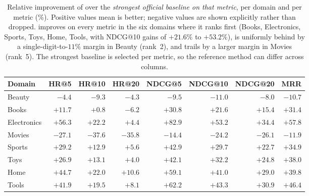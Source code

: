 \begin{table}[t]
\centering
\scriptsize
\setlength{\tabcolsep}{4pt}
\caption{Relative improvement of \method{} over the \emph{strongest official
baseline on that metric}, per domain and per metric (\%). Positive values mean
\method{} is better; negative values are shown explicitly rather than dropped.
\method{} improves on every metric in the six domains where it ranks first
(Books, Electronics, Sports, Toys, Home, Tools, with NDCG@10 gains of
$+21.6\%$ to $+53.2\%$), is uniformly behind by a single-digit-to-$11\%$ margin
in Beauty (rank~2), and trails by a larger margin in Movies (rank~5). The
strongest baseline is selected per metric, so the reference method can differ
across columns.}
\label{tab:improvement_over_strongest}
\begin{tabular}{lrrrrrrr}
\toprule
Domain & HR@5 & HR@10 & HR@20 & NDCG@5 & NDCG@10 & NDCG@20 & MRR \\
\midrule
Beauty & $-4.4$ & $-9.3$ & $-4.3$ & $-9.5$ & $-11.0$ & $-8.0$ & $-10.7$ \\
Books & $+11.7$ & $+0.8$ & $-6.2$ & $+30.8$ & $+21.6$ & $+15.4$ & $+31.4$ \\
Electronics & $+56.3$ & $+22.2$ & $+4.4$ & $+82.9$ & $+53.2$ & $+34.4$ & $+57.8$ \\
Movies & $-27.1$ & $-37.6$ & $-35.8$ & $-14.4$ & $-24.2$ & $-26.1$ & $-11.9$ \\
Sports & $+29.2$ & $+12.9$ & $+5.6$ & $+42.9$ & $+29.7$ & $+22.7$ & $+34.9$ \\
Toys & $+26.9$ & $+13.1$ & $+4.0$ & $+42.1$ & $+32.2$ & $+24.8$ & $+38.0$ \\
Home & $+44.7$ & $+22.0$ & $+10.6$ & $+59.1$ & $+41.0$ & $+29.0$ & $+39.8$ \\
Tools & $+41.9$ & $+19.5$ & $+8.1$ & $+62.2$ & $+43.3$ & $+30.9$ & $+46.4$ \\
\bottomrule
\end{tabular}
\end{table}
